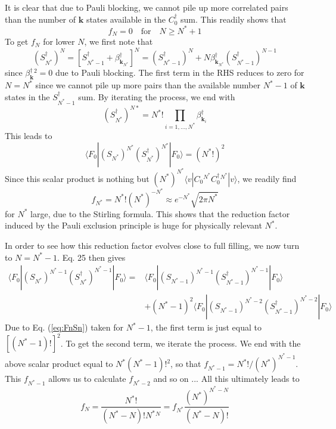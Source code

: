 \documentclass[aps,prb,preprint,groupedaddress,amsmath]{revtex4}
\newcommand{\vk}{\ensuremath{\mathbf{k}}}
\newcommand{\dg}{\ensuremath{\dagger}}
\begin{document}
It is clear that due to Pauli blocking, we cannot pile up more correlated pairs than the number of $\vk$ states available in the $C^\dg_0$ sum.  This readily shows that
\begin{equation}
f_N=0\quad \mbox{for}\quad N\geq{}N^*+1
\end{equation}
To get $f_N$ for lower $N$, 
we first note that 
\begin{equation}
(S_{N^*}^\dg)^{N}=[S^\dg_{N^*-1}+\beta^\dg_{\vk_{N^*}}]^{N}=(S_{N^*-1}^\dg)^{N}+N\beta^\dg_{\vk_{N^*}}(S_{N^*-1}^\dg)^{N-1}
\end{equation}
since $\beta^\dg_\vk{}^2=0$ due to Pauli blocking.
The first term in the RHS reduces to zero for $N=N^*$ since we cannot pile up more pairs than the available number $N^*-1$ of $\vk$ states in the $S^\dg_{N^*-1}$ sum. By iterating the process, we end with 
\begin{equation}
(S^\dg_{N^*})^{N*}=N^*!\prod_{i=1,\dots,N^*}\beta_{\vk_i}^\dg
\end{equation}
 This leads to 
\begin{equation}\label{eq:FnSn}
\langle{F_0}|(S_{N^*}^{})^{N^*}(S_{N^*}^\dg)^{N^*}|F_0\rangle=(N^*!)^2
\end{equation}
Since this scalar product is nothing but $(N^*)^{N^*}\langle{}v|C_0{}^{N^*}C_0^\dg{}^{N^*}|v\rangle$, we readily find
 \begin{equation}
f_{N^*}=N^*!(N^*)^{-N^*}\approx{}e^{-N^*}\sqrt{2\pi{N^*}}
\end{equation}
 for $N^*$ large, due to the Stirling formula. This shows that the reduction factor induced by the Pauli exclusion principle is huge for physically relevant $N^*$.
 
 In order to see how this reduction factor evolves close to full filling, we now turn to $N=N^*-1$. Eq. 25 then gives 
 \begin{equation}
 \begin{split}
\langle{F_0}|(S_{N^*}^{})^{N^*-1}(S_{N^*}^\dg)^{N^*-1}|F_0\rangle
=&\langle{F_0}|(S_{N^*-1}^{})^{N^*-1}(S_{N^*-1}^\dg)^{N^*-1}|F_0\rangle\\
&+(N^*-1)^2\langle{F_0}|(S_{N^*-1}^{})^{N^*-2}(S_{N^*-1}^\dg)^{N^*-2}|F_0\rangle
\end{split}
\end{equation} 
Due to Eq. (\ref{eq:FnSn}) taken for $N^*-1$, the first term is just equal to $[(N^*-1)!]^2$. To get the second term, we iterate the process. We end with the above scalar product equal to $N^*(N^*-1)!^2$, so that $f_{N^*-1}=N^*!/(N^*)^{N^*-1}$.  This $f_{N^*-1}$ allows us to calculate $f_{N^*-2}$ and so on ...  All this ultimately leads to
\begin{equation}\label{eq:fN}
f_N=\frac{N^*!}{(N^*-N)!N^*{}^N}=f_{N^*}\frac{(N^*)^{N^*-N}}{(N^*-N)!}
\end{equation}
\end{document}

